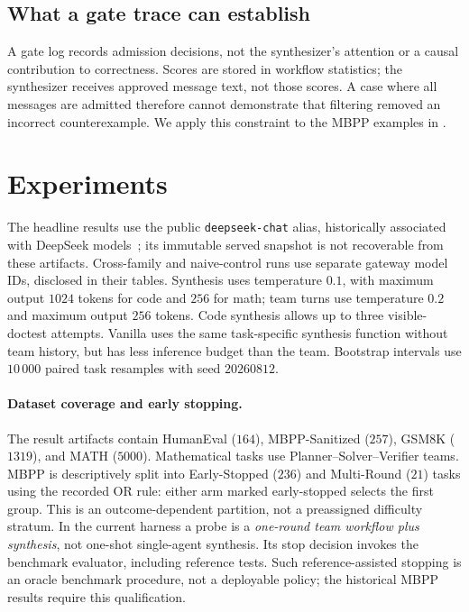 \documentclass[11pt,twoside,twocolumn,letterpaper]{article}
\begin{document}
\subsection{What a gate trace can establish}
A gate log records admission decisions, not the synthesizer's attention or a causal contribution to correctness. Scores are stored in workflow statistics; the synthesizer receives approved message text, not those scores. A case where all messages are admitted therefore cannot demonstrate that filtering removed an incorrect counterexample. We apply this constraint to the MBPP examples in .

\section{Experiments}\label{sec:experiments}

The headline results use the public \texttt{deepseek-chat} alias, historically associated with DeepSeek models~\cite{deepseek2024deepseekv3}; its immutable served snapshot is not recoverable from these artifacts. Cross-family and naive-control runs use separate gateway model IDs, disclosed in their tables. Synthesis uses temperature $0.1$, with maximum output $1024$ tokens for code and $256$ for math; team turns use temperature $0.2$ and maximum output $256$ tokens. Code synthesis allows up to three visible-doctest attempts. Vanilla uses the same task-specific synthesis function without team history, but has less inference budget than the team. Bootstrap intervals use $10\,000$ paired task resamples with seed $20260812$.

\paragraph{Dataset coverage and early stopping.} The result artifacts contain HumanEval ($164$), MBPP-Sanitized ($257$), GSM8K ($1319$), and MATH ($5000$). Mathematical tasks use Planner--Solver--Verifier teams. MBPP is descriptively split into Early-Stopped ($236$) and Multi-Round ($21$) tasks using the recorded OR rule: either arm marked early-stopped selects the first group. This is an outcome-dependent partition, not a preassigned difficulty stratum. In the current harness a probe is a \emph{one-round team workflow plus synthesis}, not one-shot single-agent synthesis. Its stop decision invokes the benchmark evaluator, including reference tests. Such reference-assisted stopping is an oracle benchmark procedure, not a deployable policy; the historical MBPP results require this qualification.
\end{document}
